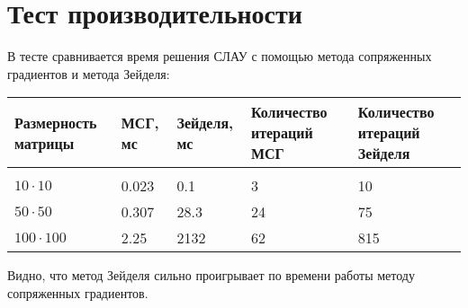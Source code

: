 \section{Тест производительности}
В тесте сравнивается время решения СЛАУ с помощью метода сопряженных градиентов и метода Зейделя:
\begin{longtable}{|p{3.5cm}|p{2cm}|p{2cm}|p{3cm}|p{3cm}}
    \hline
    Размерность матрицы&МСГ, мс&Зейделя, мс&Количество итераций МСГ&Количество итераций Зейделя\\
    \hline
    \rowcolor{lightgray}
    \multicolumn{5}{|c|} {}\\
    \hline
    $10\cdot10$&0.023&0.1&3&10\\
    \hline
    $50\cdot50$&0.307&28.3&24&75\\
    \hline
    $100\cdot100$&2.25&2132&62&815\\
    \hline
\end{longtable}

Видно, что метод Зейделя сильно проигрывает по времени работы методу сопряженных градиентов.

\pagebreak
